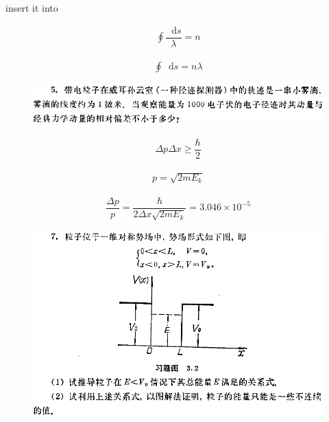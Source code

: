 \documentclass{article}
\newcommand*{\md}{\mathop{}\!\mathrm{d}}
\begin{document}
insert it into

\begin{equation*}
  \begin{aligned}
    \oint \dfrac{\md s}{\lambda}  = n
  \end{aligned}
\end{equation*}

\begin{equation*}
  \begin{aligned}
    \oint \md s = n \lambda
  \end{aligned}
\end{equation*}

\begin{figure}[H]
  \centering
  \includegraphics[width=\linewidth]{figures/5}
  \label{fig:}
\end{figure}

\begin{equation*}
  \begin{aligned}
    \Delta p \Delta x \ge \dfrac{\hbar}{2} 
  \end{aligned}
\end{equation*}

\begin{equation*}
  \begin{aligned}
    p = \sqrt{2 m E_k} 
  \end{aligned}
\end{equation*}

\begin{equation*}
  \begin{aligned}
    \dfrac{\Delta p}{p}  = \dfrac{\hbar}{2 \Delta x \sqrt{2 m E_k}} = 3.046 \times 10^{-5}
  \end{aligned}
\end{equation*}

\begin{figure}[H]
  \centering
  \includegraphics[width=\linewidth]{figures/7}
  \label{fig:}
\end{figure}
\end{document}

